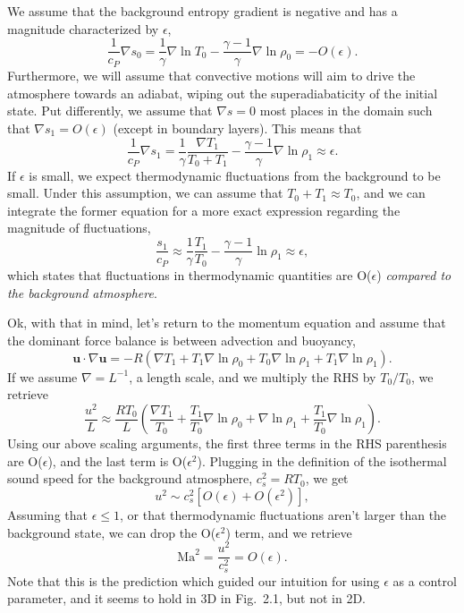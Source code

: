 \documentclass[aps, pre, onecolumn, nofootinbib, notitlepage, groupedaddress, amsfonts, amssymb, amsmath, longbibliography, superscriptaddress]{revtex4-1}
\newcommand{\grad}{\ensuremath{\nabla}}
\begin{document}
We assume that the background entropy gradient is negative and has a magnitude characterized by $\epsilon$,
$$
\frac{1}{c_P}\grad s_0 = \frac{1}{\gamma}\grad\ln T_0 - \frac{\gamma - 1}{\gamma}\grad \ln \rho_0 = -O(\epsilon).
$$
Furthermore, we will assume that convective motions will aim to drive the atmosphere towards an adiabat, wiping out the superadiabaticity of the initial state.
Put differently, we assume that $\grad s = 0$ most places in the domain such that $\grad s_1 = O(\epsilon)$ (except in boundary layers).
This means that
$$
\frac{1}{c_P}\grad s_1 = \frac{1}{\gamma}\frac{\grad T_1}{T_0 + T_1} - \frac{\gamma - 1}{\gamma}\grad\ln\rho_1 \approx \epsilon.
$$
If $\epsilon$ is small, we expect thermodynamic fluctuations from the background to be small.
Under this assumption, we can assume that $T_0 + T_1 \approx T_0$, and we can integrate the former equation for a more exact expression regarding the magnitude of fluctuations,
\begin{equation}
\frac{s_1}{c_P} \approx \frac{1}{\gamma}\frac{T_1}{T_0} - \frac{\gamma-1}{\gamma}\ln\rho_1 \approx \epsilon,
\end{equation}
which states that fluctuations in thermodynamic quantities are O($\epsilon$) \emph{compared to the background atmosphere}.

Ok, with that in mind, let's return to the momentum equation and assume that the dominant force balance is between advection and buoyancy,
$$
\bm{u}\cdot\grad\bm{u} = - R(\grad T_1 + T_1 \grad\ln\rho_0 + T_0 \grad\ln\rho_1 + T_1 \grad\ln\rho_1).
$$
If we assume $\grad = L^{-1}$, a length scale, and we multiply the RHS by $T_0 / T_0$, we retrieve
$$
\frac{u^2}{L} \approx \frac{R T_0}{L}\left(\frac{\grad T_1}{T_0} + \frac{T_1}{T_0}\grad\ln\rho_0 + \grad\ln\rho_1 + \frac{T_1}{T_0}\grad\ln\rho_1 \right).
$$
Using our above scaling arguments, the first three terms in the RHS parenthesis are O($\epsilon$), and the last term is O($\epsilon^2$).
Plugging in the definition of the isothermal sound speed for the background atmosphere, $c_s^2 = R T_0$, we get
$$
u^2 \sim c_s^2 [ O(\epsilon) + O(\epsilon^2) ],
$$
Assuming that $\epsilon \leq 1$, or that thermodynamic fluctuations aren't larger than the background state, we can drop the O($\epsilon^2$) term, and we retrieve
$$
\text{Ma}^2 = \frac{u^2}{c_s^2} = O(\epsilon).
$$
Note that this is the prediction which guided our intuition for using $\epsilon$ as a control parameter, and it seems to hold in 3D in Fig.~2.1, but not in 2D.
\end{document}

